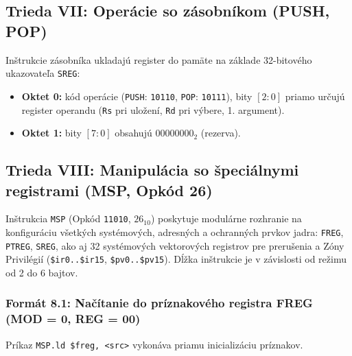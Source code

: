 \documentclass[11pt,a4paper]{article}
\newcommand{\reg}[1]{\texttt{#1}}
\newcommand{\bits}[1]{\texttt{#1}}
\begin{document}
\subsection{Trieda VII: Operácie so zásobníkom (PUSH, POP)}
Inštrukcie zásobníka ukladajú register do pamäte na základe 32-bitového ukazovateľa \reg{SREG}:
\begin{itemize}
  \item \textbf{Oktet 0:} kód operácie (\texttt{PUSH}: \bits{10110}, \texttt{POP}: \bits{10111}), bity $[2:0]$ priamo určujú register operandu (\reg{Rs} pri uložení, \reg{Rd} pri výbere, 1. argument).
  \item \textbf{Oktet 1:} bity $[7:0]$ obsahujú $00000000_2$ (rezerva).
\end{itemize}

\subsection{Trieda VIII: Manipulácia so špeciálnymi registrami (MSP, Opkód 26)}
Inštrukcia \texttt{MSP} (Opkód \bits{11010}, $26_{10}$) poskytuje modulárne rozhranie na konfiguráciu všetkých systémových, adresných a ochranných prvkov jadra: \reg{FREG}, \reg{PTREG}, \reg{SREG}, ako aj 32 systémových vektorových registrov pre prerušenia a Zóny Privilégií (\texttt{\$ir0..\$ir15}, \texttt{\$pv0..\$pv15}). Dĺžka inštrukcie je v závislosti od režimu od 2 do 6 bajtov.

\subsubsection{Formát 8.1: Načítanie do príznakového registra FREG (MOD = 0, REG = 00)}
Príkaz \texttt{MSP.ld \$freg, <src>} vykonáva priamu inicializáciu príznakov.
\end{document}
